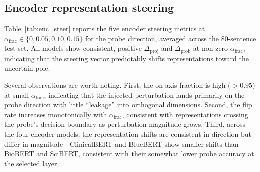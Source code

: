 \documentclass[11pt,a4paper]{article}
\begin{document}
\subsection{Encoder representation steering}
\label{sec:encsteer}

Table~\ref{tab:enc_steer} reports the five encoder steering metrics at
$\alpha_{\mathrm{frac}} \in \{0, 0.05, 0.10, 0.15\}$ for the probe
direction, averaged across the 80-sentence test set. All models show
consistent, positive $\Delta_{\text{proj}}$ and $\Delta_{\text{prob}}$
at non-zero $\alpha_{\mathrm{frac}}$, indicating that the steering vector
predictably shifts representations toward the uncertain pole.

Several observations are worth noting. First, the on-axis fraction is
high ($>0.95$) at small $\alpha_{\mathrm{frac}}$, indicating that the
injected perturbation lands primarily on the probe direction with little
``leakage'' into orthogonal dimensions. Second, the flip rate increases
monotonically with $\alpha_{\mathrm{frac}}$, consistent with
representations crossing the probe's decision boundary as perturbation
magnitude grows. Third, across the four encoder models, the
representation shifts are consistent in direction but differ in
magnitude---ClinicalBERT and BlueBERT show smaller shifts than BioBERT
and SciBERT, consistent with their somewhat lower probe accuracy at the
selected layer.
\end{document}
